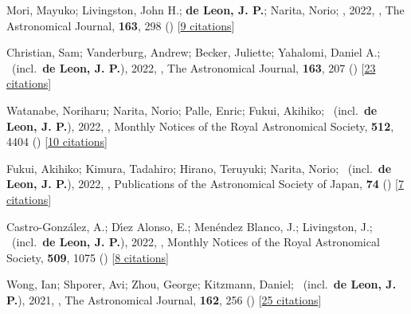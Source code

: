 \item[{\color{numcolor}\scriptsize46}] Mori, Mayuko; Livingston, John H.; \textbf{de Leon, J. P.}; Narita, Norio; \etal, 2022, , The Astronomical Journal, \textbf{163}, 298 () [\href{https://ui.adsabs.harvard.edu/abs/2022AJ....163..298M}{9 citations}]

\item[{\color{numcolor}\scriptsize45}] Christian, Sam; Vanderburg, Andrew; Becker, Juliette; Yahalomi, Daniel A.; \etal\ (incl.\ \textbf{de Leon, J. P.}), 2022, , The Astronomical Journal, \textbf{163}, 207 () [\href{https://ui.adsabs.harvard.edu/abs/2022AJ....163..207C}{23 citations}]

\item[{\color{numcolor}\scriptsize44}] Watanabe, Noriharu; Narita, Norio; Palle, Enric; Fukui, Akihiko; \etal\ (incl.\ \textbf{de Leon, J. P.}), 2022, , Monthly Notices of the Royal Astronomical Society, \textbf{512}, 4404 () [\href{https://ui.adsabs.harvard.edu/abs/2022MNRAS.512.4404W}{10 citations}]

\item[{\color{numcolor}\scriptsize43}] Fukui, Akihiko; Kimura, Tadahiro; Hirano, Teruyuki; Narita, Norio; \etal\ (incl.\ \textbf{de Leon, J. P.}), 2022, , Publications of the Astronomical Society of Japan, \textbf{74} () [\href{https://ui.adsabs.harvard.edu/abs/2022PASJ...74L...1F}{7 citations}]

\item[{\color{numcolor}\scriptsize42}] Castro-Gonz{\'a}lez, A.; D{\'\i}ez Alonso, E.; Men{\'e}ndez Blanco, J.; Livingston, J.; \etal\ (incl.\ \textbf{de Leon, J. P.}), 2022, , Monthly Notices of the Royal Astronomical Society, \textbf{509}, 1075 () [\href{https://ui.adsabs.harvard.edu/abs/2022MNRAS.509.1075C}{8 citations}]

\item[{\color{numcolor}\scriptsize41}] Wong, Ian; Shporer, Avi; Zhou, George; Kitzmann, Daniel; \etal\ (incl.\ \textbf{de Leon, J. P.}), 2021, , The Astronomical Journal, \textbf{162}, 256 () [\href{https://ui.adsabs.harvard.edu/abs/2021AJ....162..256W}{25 citations}]

